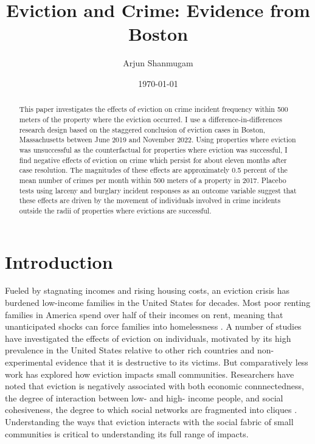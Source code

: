 \documentclass[12pt]{article}
\begin{document}
\begin{titlepage}
\title{Eviction and Crime: Evidence from Boston}
\author{Arjun Shanmugam}
\date{\today}
\maketitle
\begin{abstract}
\noindent This paper investigates the effects of eviction on crime incident frequency within 500 meters of the property where the eviction occurred. I use a difference-in-differences research design based on the staggered conclusion of eviction cases in Boston, Massachusetts between June 2019 and November 2022. Using properties where eviction was unsuccessful as the counterfactual for properties where eviction was successful, I find negative effects of eviction on crime which persist for about eleven months after case resolution. The magnitudes of these effects are approximately 0.5 percent of the mean number of crimes per month within 500 meters of a property in 2017. Placebo tests using larceny and burglary incident responses as an outcome variable suggest that these effects are driven by the movement of individuals involved in crime incidents outside the radii of properties where evictions are successful.


\bigskip
\end{abstract}
\setcounter{page}{0}
\thispagestyle{empty}
\end{titlepage}
\pagebreak \newpage

\doublespacing

\section{Introduction} \label{sec:introduction}
Fueled by stagnating incomes and rising housing costs, an eviction crisis has burdened low-income families in the United States for decades. Most poor renting families in America spend over half of their incomes on rent, meaning that unanticipated shocks can force families into homelessness \citep{desmond_evicted:_2017}. A number of studies have investigated the effects of eviction on individuals, motivated by its high prevalence in the United States relative to other rich countries \citep{oecd_affordable_housing_database_hc3.3._2021} and non-experimental evidence that it is destructive to its victims. But comparatively less work has explored how eviction impacts small communities. Researchers have noted that eviction is negatively associated with both economic connnectedness, the degree of interaction between low- and high- income people, and social cohesiveness, the degree to which social networks are fragmented into cliques \citep{weaver_no_2023, chetty_social_2022}. Understanding the ways that eviction interacts with the social fabric of small communities is critical to understanding its full range of impacts. 
\end{document}
